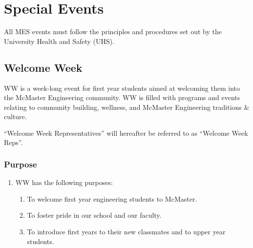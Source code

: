 \section{Special Events}
\label{special-events}
All MES events must follow the principles and procedures set out by the
University Health and Safety (UHS).

\subsection{Welcome Week}
\label{welcome-week}

WW is a week-long event for first year students aimed at welcoming them into the McMaster Engineering community. WW is filled with programs and events relating to community building, wellness, and McMaster Engineering traditions \& culture. %

``Welcome Week Representatives'' will hereafter be referred to as
``Welcome Week Reps''.

\subsubsection{Purpose}
\label{purpose-1}

\begin{enumerate}
 \item
  WW has the following purposes:

  \begin{enumerate}
   \item
    To welcome first year engineering students to McMaster.
   \item
    To foster pride in our school and our faculty.
   \item
    To introduce first years to their new classmates and to upper year students.

  \end{enumerate}
\end{enumerate}

